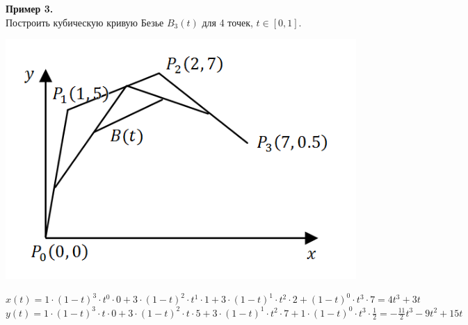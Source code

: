 \noindent \textbf{Пример 3.}\\
Построить кубическую кривую Безье $B_3(t)$ для 4 точек, $t\in [0, 1]$.\begin{center}
    \includegraphics[scale=0.7]{l3_9.png}\end{center}
$x(t) = 1\cdot (1-t)^3\cdot t^0\cdot 0+3\cdot (1-t)^2\cdot t^1\cdot 1+3\cdot (1-t)^1\cdot t^2\cdot 2+(1-t)^0\cdot t^3\cdot 7 = 4t^3+3t$\\
$y(t) = 1\cdot (1-t)^3\cdot t\cdot 0+3\cdot (1-t)^2\cdot t\cdot 5+3\cdot (1-t)^1\cdot t^2\cdot 7+1\cdot (1-t)^0\cdot t^3\cdot \frac{1}{2} = - \frac{11}{2}t^3-9t^2+15t$\\ \\
